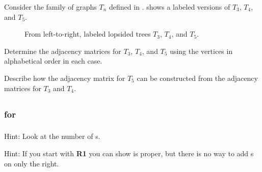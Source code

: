 \begin{exer}[\exerE] %
\label{exer_adj_matrix_rec_trees}
    Consider the family of graphs $T_n$ defined in .  shows a labeled versions of $T_3$, $T_4$, and $T_5$.
        \begin{figure}[hbtp]
            \centering
            
            \caption{From left-to-right, labeled lopsided trees $T_3$, $T_4$, and $T_5$.}
            \label{fig_rec_trees_labeled}
        \end{figure}
        \begin{exerpart}
            \item Determine the adjacency matrices for $T_3$, $T_4$, and $T_5$ using the vertices in alphabetical order in each case.
            \item Describe how the adjacency matrix for $T_5$ can be constructed from the adjacency matrices for $T_3$ and $T_4$. 
        \end{exerpart}
\end{exer}


\subsection{\answers}

\subsubsection{\answers for  \subproperbs}

\subsubsection*{ \answers}
\begin{apart}
    \item Hint: Look at the number of s.
    \item Hint: If you start with \textbf{R1} you can show  is proper, but there is no way to add s on only the right.
\end{apart}

